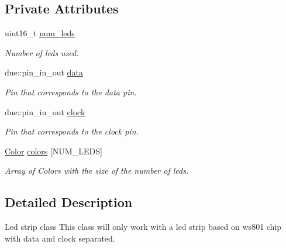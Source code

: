 \subsection*{Private Attributes}
\begin{DoxyCompactItemize}
\item 
uint16\+\_\+t \hyperlink{classled__strip_a2ea7f1f40f296c61d2eb93d3e1b45436}{num\+\_\+leds}\hypertarget{classled__strip_a2ea7f1f40f296c61d2eb93d3e1b45436}{}\label{classled__strip_a2ea7f1f40f296c61d2eb93d3e1b45436}

\begin{DoxyCompactList}\small\item\em Number of leds used. \end{DoxyCompactList}\item 
due\+::pin\+\_\+in\+\_\+out \hyperlink{classled__strip_ac06ac086bc492b8b90d4bdec5a1665e7}{data}\hypertarget{classled__strip_ac06ac086bc492b8b90d4bdec5a1665e7}{}\label{classled__strip_ac06ac086bc492b8b90d4bdec5a1665e7}

\begin{DoxyCompactList}\small\item\em Pin that corresponds to the data pin. \end{DoxyCompactList}\item 
due\+::pin\+\_\+in\+\_\+out \hyperlink{classled__strip_a9114ec90b6a38eb93b360f38ffef1f04}{clock}\hypertarget{classled__strip_a9114ec90b6a38eb93b360f38ffef1f04}{}\label{classled__strip_a9114ec90b6a38eb93b360f38ffef1f04}

\begin{DoxyCompactList}\small\item\em Pin that corresponds to the clock pin. \end{DoxyCompactList}\item 
\hyperlink{classColor}{Color} \hyperlink{classled__strip_aab51ee07d240842369857eb6e07c0738}{colors} \mbox{[}N\+U\+M\+\_\+\+L\+E\+DS\mbox{]}\hypertarget{classled__strip_aab51ee07d240842369857eb6e07c0738}{}\label{classled__strip_aab51ee07d240842369857eb6e07c0738}

\begin{DoxyCompactList}\small\item\em Array of Colors with the size of the number of leds. \end{DoxyCompactList}\end{DoxyCompactItemize}


\subsection{Detailed Description}
Led strip class This class will only work with a led strip based on ws801 chip with data and clock separated. 

